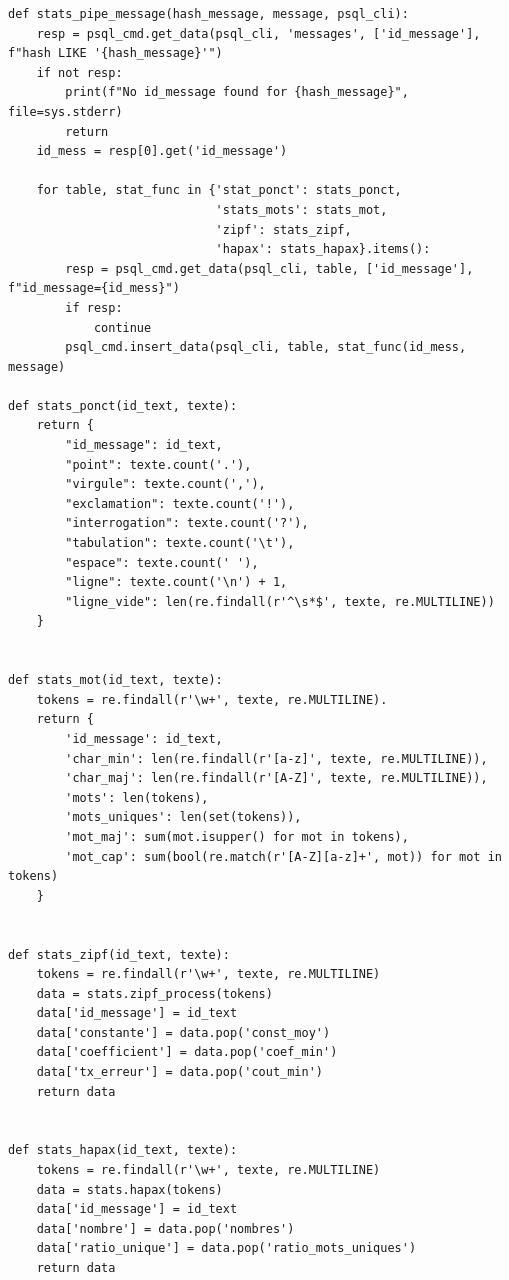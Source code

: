 \documentclass[a4paper,12pt]{article}
\begin{document}
		\begin{lstlisting}[title=Pipeline pour chaque message]
def stats_pipe_message(hash_message, message, psql_cli):
    resp = psql_cmd.get_data(psql_cli, 'messages', ['id_message'], f"hash LIKE '{hash_message}'")
    if not resp:
        print(f"No id_message found for {hash_message}", file=sys.stderr)
        return
    id_mess = resp[0].get('id_message')

    for table, stat_func in {'stat_ponct': stats_ponct,
                             'stats_mots': stats_mot,
                             'zipf': stats_zipf,
                             'hapax': stats_hapax}.items():
        resp = psql_cmd.get_data(psql_cli, table, ['id_message'], f"id_message={id_mess}")
        if resp:
            continue
        psql_cmd.insert_data(psql_cli, table, stat_func(id_mess, message)
        
def stats_ponct(id_text, texte):
    return {
        "id_message": id_text,
        "point": texte.count('.'),
        "virgule": texte.count(','),
        "exclamation": texte.count('!'),
        "interrogation": texte.count('?'),
        "tabulation": texte.count('\t'),
        "espace": texte.count(' '),
        "ligne": texte.count('\n') + 1,
        "ligne_vide": len(re.findall(r'^\s*$', texte, re.MULTILINE))
    }


def stats_mot(id_text, texte):
    tokens = re.findall(r'\w+', texte, re.MULTILINE).
    return {
        'id_message': id_text,
        'char_min': len(re.findall(r'[a-z]', texte, re.MULTILINE)),
        'char_maj': len(re.findall(r'[A-Z]', texte, re.MULTILINE)),
        'mots': len(tokens),
        'mots_uniques': len(set(tokens)),
        'mot_maj': sum(mot.isupper() for mot in tokens),
        'mot_cap': sum(bool(re.match(r'[A-Z][a-z]+', mot)) for mot in tokens)
    }


def stats_zipf(id_text, texte):
    tokens = re.findall(r'\w+', texte, re.MULTILINE)
    data = stats.zipf_process(tokens)
    data['id_message'] = id_text
    data['constante'] = data.pop('const_moy')
    data['coefficient'] = data.pop('coef_min')
    data['tx_erreur'] = data.pop('cout_min')
    return data


def stats_hapax(id_text, texte):
    tokens = re.findall(r'\w+', texte, re.MULTILINE)
    data = stats.hapax(tokens)
    data['id_message'] = id_text
    data['nombre'] = data.pop('nombres')
    data['ratio_unique'] = data.pop('ratio_mots_uniques')
    return data
		\end{lstlisting}
		
\end{document}
